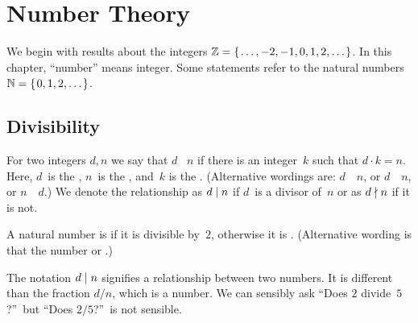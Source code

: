 \documentclass{ibl}  %
\begin{document}
    
\coverpage{}


\mainmatter
\pagestyle{bodypage}
\chapter{Number Theory}

We begin with results about the integers $\mathbb{Z}=\mbox{$\{\hspace{0.1em}\ldots,-2,-1,0,1,2,\ldots\hspace{0.1em}\}$}$.
In this chapter, ``number'' means integer.
Some statements refer to the natural numbers $\mathbb{N}=\mbox{$\{\hspace{0.1em}0,1,2,\ldots\hspace{0.1em}\}$}$.


\section{Divisibility}

\begin{df}
  For two integers $d,n$ we say that
  $d$ ~$n$
  if there is an integer~$k$ such that $d\cdot k=n$.
  Here, $d$~is the , 
  $n$~is the ,
  and~$k$ is the .
  (Alternative wordings are:
  $d$~~$n$,
  or $d$~~$n$,
  or $n$~~$d$.)
  We denote the relationship as
  $d\mid n$ if $d$~is a divisor of~$n$
  or as $d\nmid n$ if it is not.
\end{df}

\begin{df}
  A natural number is  if it is divisible by~$2$,
  otherwise it is .
  (Alternative wording is that the number 
  or .)
\end{df}

The notation $d\mid n$ signifies a relationship between two numbers.
It is different than the fraction $d/n$, which is a number.
We can sensibly ask ``Does $2$ divide~$5$?''\
but ``Does $2/5$?''\ is not sensible.   
\end{document}
